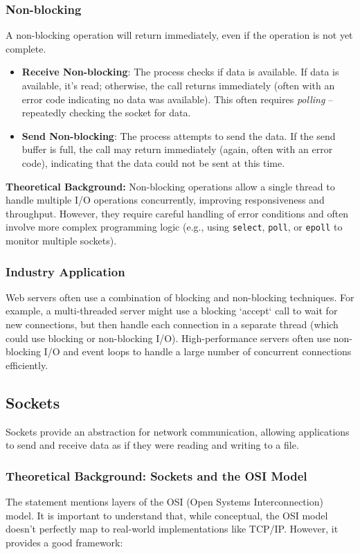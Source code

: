 \subsubsection{Non-blocking}
A non-blocking operation will return immediately, even if the operation is not yet complete.
\begin{itemize}[itemsep=1pt]
    \item \textbf{Receive Non-blocking}:  The process checks if data is available.  If data is available, it's read; otherwise, the call returns immediately (often with an error code indicating no data was available).  This often requires \textit{polling} -- repeatedly checking the socket for data.
    \item \textbf{Send Non-blocking}: The process attempts to send the data.  If the send buffer is full, the call may return immediately (again, often with an error code), indicating that the data could not be sent at this time.
\end{itemize}
\textbf{Theoretical Background:} Non-blocking operations allow a single thread to handle multiple I/O operations concurrently, improving responsiveness and throughput.  However, they require careful handling of error conditions and often involve more complex programming logic (e.g., using \texttt{select}, \texttt{poll}, or \texttt{epoll} to monitor multiple sockets).


\subsubsection{Industry Application} 
Web servers often use a combination of blocking and non-blocking techniques.  For example, a multi-threaded server might use a blocking `accept` call to wait for new connections, but then handle each connection in a separate thread (which could use blocking or non-blocking I/O).  High-performance servers often use non-blocking I/O and event loops to handle a large number of concurrent connections efficiently.

\subsection{Sockets}
Sockets provide an abstraction for network communication, allowing applications to send and receive data as if they were reading and writing to a file.

\subsubsection{Theoretical Background: Sockets and the OSI Model}
The statement mentions layers of the OSI (Open Systems Interconnection) model. It is important to understand that, while conceptual, the OSI model doesn't perfectly map to real-world implementations like TCP/IP. However, it provides a good framework:

